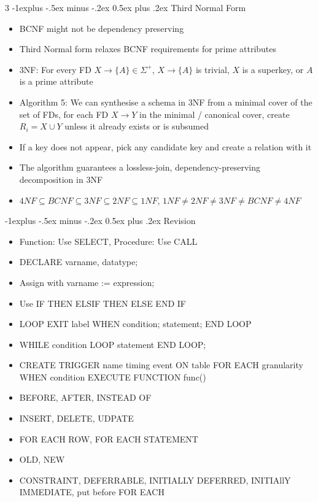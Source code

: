 \documentclass[10pt, landscape]{article}
\makeatletter
\renewcommand{\section}{\@startsection{section}{1}{0mm}%
                                {-1ex plus -.5ex minus -.2ex}%
                                {0.5ex plus .2ex}%
                                {\normalfont\large\bfseries}}
\renewcommand{\section}{\@startsection{section}{2}{0mm}%
                                {-1explus -.5ex minus -.2ex}%
                                {0.5ex plus .2ex}%
                                {\normalfont\normalsize\bfseries}}
\makeatother
\begin{document}
\begin{multicols*}{3}
\section{Third Normal Form}
\begin{itemize}
    \item BCNF might not be dependency preserving
    \item Third Normal form relaxes BCNF requirements for prime attributes
    \item 3NF: For every FD $X \rightarrow \{A\} \in \Sigma^+$, $X \rightarrow \{A\}$ is trivial, $X$ is a superkey, or $A$ is a prime attribute
    \item Algorithm 5: We can synthesise a schema in 3NF from a minimal cover of the set of FDs, for each FD $X \rightarrow Y$ in the minimal / canonical cover, create $R_i = X \cup Y$ unless it already exists or is subsumed
    \item If a key does not appear, pick any candidate key and create a relation with it
    \item The algorithm guarantees a lossless-join, dependency-preserving decomposition in 3NF
    \item $4NF \subseteq BCNF \subseteq 3NF \subseteq 2NF \subseteq 1NF$, $1NF \neq 2NF \neq 3NF \neq BCNF \neq 4NF$
\end{itemize}

\section{Revision}
\begin{itemize}
    \item Function: Use SELECT, Procedure: Use CALL
    \item DECLARE varname, datatype;
    \item Assign with varname := expression;
    \item Use IF THEN ELSIF THEN ELSE END IF
    \item LOOP EXIT label WHEN condition; statement; END LOOP
    \item WHILE condition LOOP statement END LOOP;
    \item CREATE TRIGGER name timing event ON table FOR EACH granularity WHEN condition EXECUTE FUNCTION func()
    \item BEFORE, AFTER, INSTEAD OF
    \item INSERT, DELETE, UDPATE
    \item FOR EACH ROW, FOR EACH STATEMENT
    \item OLD, NEW
    \item CONSTRAINT, DEFERRABLE, INITIALLY DEFERRED, INITIAllY IMMEDIATE, put before FOR EACH
\end{itemize}

\end{multicols*}
\end{document}
